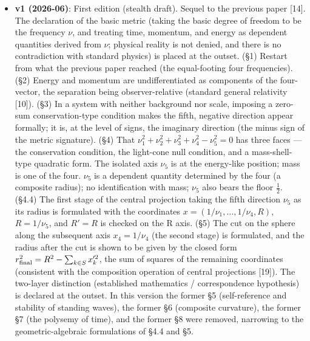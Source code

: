 \documentclass[
]{article}
\providecommand{\tightlist}{%
  \setlength{\itemsep}{0pt}\setlength{\parskip}{0pt}}
\begin{document}
\begin{itemize}
\tightlist
\item
  \textbf{v1 (2026-06)}: First edition (stealth draft). Sequel to the
  previous paper {[}14{]}. The declaration of the basic metric (taking
  the basic degree of freedom to be the frequency \(\nu\), and treating
  time, momentum, and energy as dependent quantities derived from
  \(\nu\); physical reality is not denied, and there is no contradiction
  with standard physics) is placed at the outset. (§1) Restart from what
  the previous paper reached (the equal-footing four frequencies). (§2)
  Energy and momentum are undifferentiated as components of the
  four-vector, the separation being observer-relative (standard general
  relativity {[}10{]}). (§3) In a system with neither background nor
  scale, imposing a zero-sum conservation-type condition makes the
  fifth, negative direction appear formally; it is, at the level of
  signs, the imaginary direction (the minus sign of the metric
  signature). (§4) That \(\nu_1^2+\nu_2^2+\nu_3^2+\nu_4^2-\nu_5^2=0\)
  has three faces --- the conservation condition, the light-cone null
  condition, and a mass-shell-type quadratic form. The isolated axis
  \(\nu_5\) is at the energy-like position; mass is one of the four.
  \(\nu_5\) is a dependent quantity determined by the four (a composite
  radius); no identification with mass; \(\nu_5\) also bears the floor
  \(\tfrac12\). (§4.4) The first stage of the central projection taking
  the fifth direction \(\nu_5\) as its radius is formulated with the
  coordinates \(x=(1/\nu_1,\dots,1/\nu_4,R)\), \(R=1/\nu_5\), and
  \(R'=R\) is checked on the R axis. (§5) The cut on the sphere along
  the subsequent axis \(x_4=1/\nu_4\) (the second stage) is formulated,
  and the radius after the cut is shown to be given by the closed form
  \(r_{\rm final}^2=R^2-\sum_{k\in S}x_k'^2\), the sum of squares of the
  remaining coordinates (consistent with the composition operation of
  central projections {[}19{]}). The two-layer distinction (established
  mathematics / correspondence hypothesis) is declared at the outset. In
  this version the former §5 (self-reference and stability of standing
  waves), the former §6 (composite curvature), the former §7 (the
  polysemy of time), and the former §8 were removed, narrowing to the
  geometric-algebraic formulations of §4.4 and §5.
\end{itemize}
\end{document}
